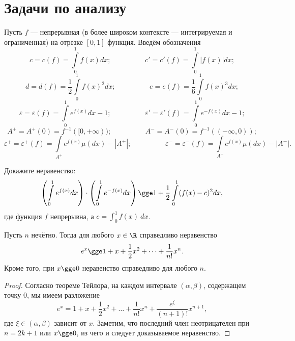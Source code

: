 \documentclass[a4paper, 12pt]{article}
\begin{document}
\section*{Задачи по анализу}

\begin{agreement*}
    Пусть \(f\) --- непрерывная (в более широком контексте --- интегрируемая и ограниченная) на отрезке \([0,1]\) функция. Введём обозначения \[c = c(f) = \int\limits_0^1 f(x) dx; \hspace{2cm} c' = c'(f) = \int\limits_0^1 |f(x)| dx; \]\[ d = d(f) = \frac{1}{2} \int\limits_0^1 f(x)^2 dx; \hspace{2cm} e = e(f) = \frac{1}{6} \int\limits_0^1 f(x)^3 dx; \]\[ \varepsilon = \varepsilon(f) = \int\limits_0^1 e^{f(x)} dx - 1; \hspace{2cm} \varepsilon' = \varepsilon'(f) = \int\limits_0^1 e^{-f(x)} dx - 1;\] \[A^+ = A^+(0) = f^{-1}([0, +\infty)); \hspace{2cm} A^- = A^-(0) = f^{-1}((-\infty, 0));\] \vspace{0.5mm} \[\varepsilon^+ = \varepsilon^+ (f) = \int\limits_{A^+} e^{f(x)} \mu(dx) - |A^+|; \hspace{2cm} \varepsilon^- = \varepsilon^- (f) = \int\limits_{A^-} e^{f(x)} \mu(dx) - |A^-|.\]
\end{agreement*}


\begin{problem}
Докажите неравенство: \[\left(\int\limits_{0}^{1} e^{f(x)} dx\right) \cdot \left(\int\limits_{0}^{1} e^{-f(x)} dx\right) \gge 1 + \frac{1}{2} \int\limits_0^1 (f(x) - c)^2 dx,\] где функция \(f\) непрерывна, а \(c = \int_0^1 f(x) \ dx\).
\end{problem}

\begin{statement}\label{help1}
    Пусть \(n\) нечётно. Тогда для любого \(x \in \R\) справедливо неравенство \[e^x \gge 1 + x + \frac{1}{2}x^2 + \dots + \frac{1}{n!}x^n.\] Кроме того, при \(x \gge 0\) неравенство справедливо для любого \(n\).
\end{statement}
\begin{proof}
    Согласно теореме Тейлора, на каждом интервале \((\alpha, \beta)\), содержащем точку \(0\), мы имеем разложение \[e^x = 1 + x + \frac{1}{2} x^2 + \dots + \frac{1}{n!}x^n + \frac{e^\xi}{(n+1)!}x^{n+1},\] где \(\xi \in (\alpha, \beta)\) зависит от \(x\). Заметим, что последний член неотрицателен при \(n = 2k + 1\) или \(x \gge 0\), из чего и следует доказываемое неравенство.
\end{proof}
\end{document}

